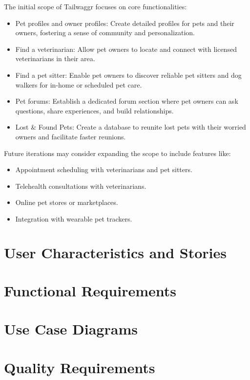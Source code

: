 \documentclass{article}
\begin{document}
The initial scope of Tailwaggr focuses on core functionalities:

\begin{itemize}
\item Pet profiles and owner profiles: Create detailed profiles for pets and their owners, fostering a sense of community and personalization.
\item Find a veterinarian: Allow pet owners to locate and connect with licensed veterinarians in their area.
\item Find a pet sitter: Enable pet owners to discover reliable pet sitters and dog walkers for in-home or scheduled pet care.
\item Pet forums: Establish a dedicated forum section where pet owners can ask questions, share experiences, and build relationships.
\item Lost \& Found Pets: Create a database to reunite lost pets with their worried owners and facilitate faster reunions.
\end{itemize}

Future iterations may consider expanding the scope to include features like:

\begin{itemize}
\item Appointment scheduling with veterinarians and pet sitters.
\item Telehealth consultations with veterinarians.
\item Online pet stores or marketplaces.
\item Integration with wearable pet trackers.
\end{itemize}

\section{User Characteristics and Stories}

\section{Functional Requirements}

\section{Use Case Diagrams}

\section{Quality Requirements}
\end{document}
